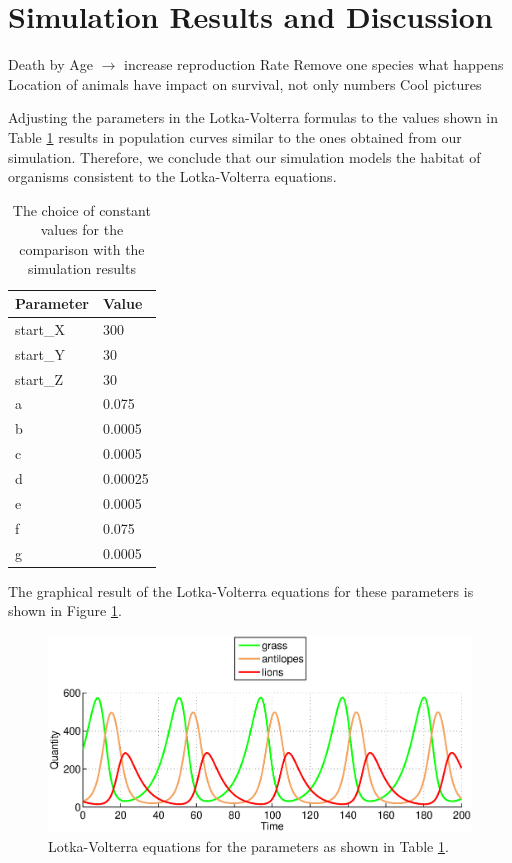 \documentclass[11pt]{article}
\begin{document}
\section{Simulation Results and Discussion}
Death by Age $\rightarrow$ increase reproduction Rate
Remove one species what happens
Location of animals have impact on survival, not only numbers
Cool pictures

Adjusting the parameters in the Lotka-Volterra formulas to the values shown in Table \ref{tab:LotkaVolterraParametersFinal} results in  population curves similar to the ones obtained from our simulation. Therefore, we conclude that our simulation models the habitat of organisms consistent to the Lotka-Volterra equations. 

\begin{table}[htbp]
\centering
\begin{tabular}{l|l}
Parameter & Value \\ 
\hline 
\hline
start\_X & 300\\
\hline
start\_Y & 30\\
\hline
start\_Z & 30\\
\hline
a & 0.075\\ 
\hline 
b & 0.0005\\ 
\hline 
c & 0.0005\\  
\hline 
d & 0.00025\\
\hline 
e & 0.0005\\
\hline 
f & 0.075\\
\hline 
g & 0.0005\\
\end{tabular}
\caption{The choice of constant values for the comparison with the simulation results}
\label{tab:LotkaVolterraParametersFinal}
\end{table}

The graphical result of the Lotka-Volterra equations for these parameters is shown in Figure \ref{fig:LotkaVolterraThreeAdjusted}.

\begin{figure}
\centering
\includegraphics[scale=0.65]{LotkaVolterraThreeAdjusted.eps}
\caption{Lotka-Volterra equations for the parameters as shown in Table \ref{tab:LotkaVolterraParametersFinal}.}
\label{fig:LotkaVolterraThreeAdjusted}
\end{figure}
\end{document}
